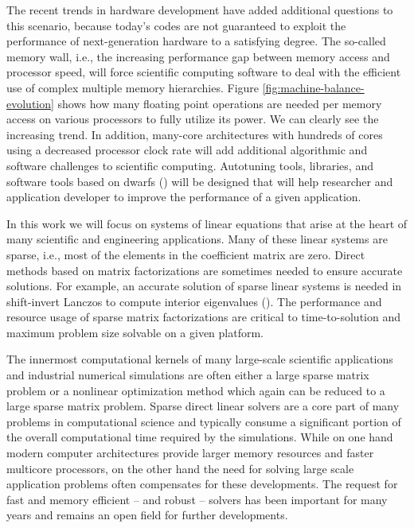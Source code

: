 The recent trends in hardware development have added additional questions to this scenario, because today's codes are not guaranteed to exploit the performance of next-generation hardware to a satisfying degree. The so-called memory wall, i.e., the increasing performance gap between memory access and processor speed, will force scientific computing software to deal with the efficient use of complex multiple memory hierarchies. {\color{blue} Figure \ref{fig:machine-balance-evolution} shows how many floating point operations are needed per memory access on various processors to fully utilize its power. We can clearly see the increasing trend.} In addition, many-core architectures with hundreds of cores using a decreased processor clock rate will add additional algorithmic and software challenges to scientific computing. Autotuning tools, libraries, and software tools based on dwarfs (\cite{10.1145/1562764.1562783}) will be designed that will help researcher and application developer to improve the performance of a given application.

In this work we will focus on systems of linear equations that arise at the heart of many scientific and engineering applications. Many of these linear systems are sparse, i.e., most of the elements in the coefficient matrix are zero. Direct methods based on matrix factorizations are sometimes needed to ensure accurate solutions. For example, an accurate solution of sparse linear systems is needed in shift-invert Lanczos to compute interior eigenvalues (\cite{lanczos-1980,https://doi.org/10.1002/nme.6640}). The performance and resource usage of sparse matrix factorizations are critical to time-to-solution and maximum problem size solvable on a given platform.

The innermost computational kernels of many large-scale scientific applications and industrial numerical simulations are often either a large sparse matrix problem or a nonlinear optimization method which again can be reduced to a large sparse matrix problem. Sparse direct linear solvers are a core part of many problems in computational science and typically consume a significant portion of the overall computational time required by the simulations. While on one hand modern computer architectures provide larger memory resources and faster multicore processors, on the other hand the need for solving large scale application problems often compensates for these developments. The request for fast and memory efficient -- and robust -- solvers has been important for many years and remains an open field for further developments.

